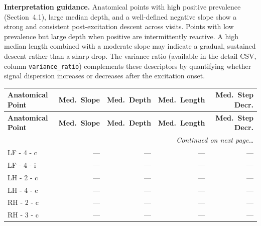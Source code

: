 \documentclass[a4paper,11pt]{article}
\begin{document}
\medskip
\noindent\textbf{Interpretation guidance.}
Anatomical points with high positive prevalence (Section~4.1), large median depth, and a
well-defined negative slope show a strong and consistent post-excitation descent across
visits.
Points with low prevalence but large depth when positive are intermittently reactive.
A high median length combined with a moderate slope may indicate a gradual, sustained
descent rather than a sharp drop.
The variance ratio (available in the detail CSV, column \texttt{variance\_ratio}) complements
these descriptors by quantifying whether signal dispersion increases or decreases after the
excitation onset.

\begin{small}
\begin{longtable}{p{4.5cm}rrrr}
\toprule
\textbf{Anatomical Point} &
\textbf{Med.\ Slope} &
\textbf{Med.\ Depth} &
\textbf{Med.\ Length} &
\textbf{Med.\ Step Decr.} \\
\midrule
\endfirsthead
\toprule
\textbf{Anatomical Point} &
\textbf{Med.\ Slope} &
\textbf{Med.\ Depth} &
\textbf{Med.\ Length} &
\textbf{Med.\ Step Decr.} \\
\midrule
\endhead
\midrule
\multicolumn{5}{r}{\small\emph{Continued on next page\ldots}} \\
\endfoot
\bottomrule
\endlastfoot
LF - 4 - c & --- & --- & --- & --- \\
LF - 4 - i & --- & --- & --- & --- \\
LH - 2 - c & --- & --- & --- & --- \\
LH - 4 - c & --- & --- & --- & --- \\
RH - 2 - c & --- & --- & --- & --- \\
RH - 3 - c & --- & --- & --- & --- \\
\end{longtable}
\end{small}
\end{document}
